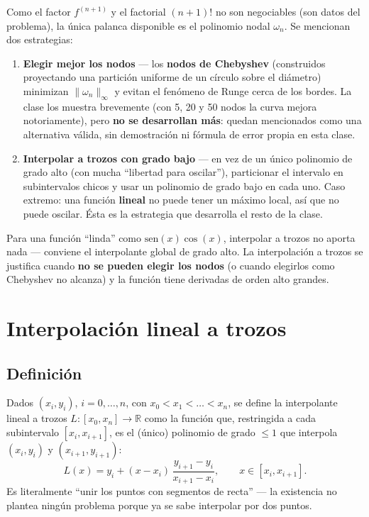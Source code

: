 \documentclass[12pt,a4paper]{article}
\begin{document}
Como el factor $f^{(n+1)}$ y el factorial $(n+1)!$ no son negociables (son
datos del problema), la única palanca disponible es el polinomio nodal
$\omega_n$. Se mencionan dos estrategias:

\begin{enumerate}
  \item \textbf{Elegir mejor los nodos} --- los \textbf{nodos de Chebyshev}
  (construidos proyectando una partición uniforme de un círculo sobre el
  diámetro) minimizan $\|\omega_n\|_\infty$ y evitan el fenómeno de Runge
  cerca de los bordes. La clase los muestra brevemente (con 5, 20 y 50 nodos
  la curva mejora notoriamente), pero \textbf{no se desarrollan más}: quedan
  mencionados como una alternativa válida, sin demostración ni fórmula de
  error propia en esta clase.
  \item \textbf{Interpolar a trozos con grado bajo} --- en vez de un único
  polinomio de grado alto (con mucha ``libertad para oscilar''), particionar
  el intervalo en subintervalos chicos y usar un polinomio de grado bajo en
  cada uno. Caso extremo: una función \textbf{lineal} no puede tener un
  máximo local, así que no puede oscilar. Ésta es la estrategia que
  desarrolla el resto de la clase.
\end{enumerate}

\begin{notebox}
Para una función ``linda'' como $\mathrm{sen}(x)\cos(x)$, interpolar a
trozos no aporta nada --- conviene el interpolante global de grado alto. La
interpolación a trozos se justifica cuando \textbf{no se pueden elegir los
nodos} (o cuando elegirlos como Chebyshev no alcanza) y la función tiene
derivadas de orden alto grandes.
\end{notebox}

\section{Interpolación lineal a trozos}

\subsection{Definición}

Dados $(x_i, y_i)$, $i=0,\dots,n$, con $x_0 < x_1 < \dots < x_n$, se define
la interpolante lineal a trozos $L: [x_0,x_n] \to \mathbb{R}$ como la
función que, restringida a cada subintervalo $[x_i, x_{i+1}]$, es el (único)
polinomio de grado $\le 1$ que interpola $(x_i,y_i)$ y $(x_{i+1},y_{i+1})$:
\[
L(x) = y_i + (x - x_i)\,\frac{y_{i+1}-y_i}{x_{i+1}-x_i}, \qquad x \in [x_i, x_{i+1}].
\]
Es literalmente ``unir los puntos con segmentos de recta'' --- la
existencia no plantea ningún problema porque ya se sabe interpolar por dos
puntos.
\end{document}
